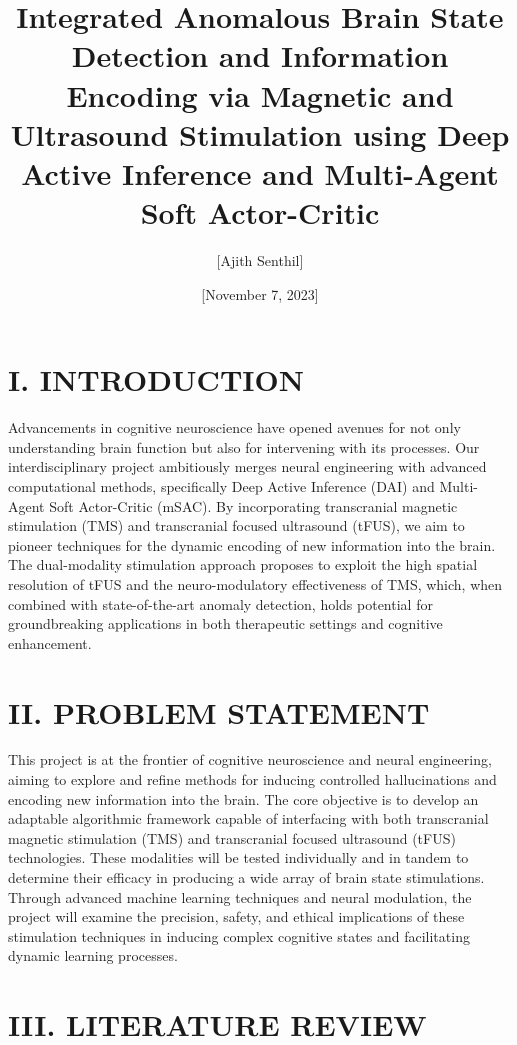 \documentclass{article}
\title{Integrated Anomalous Brain State Detection and Information Encoding via Magnetic and Ultrasound Stimulation using Deep Active Inference and Multi-Agent Soft Actor-Critic}
\author{[Ajith Senthil]}
\date{[November 7, 2023]}
\begin{document}
\maketitle


\section*{I. INTRODUCTION}
Advancements in cognitive neuroscience have opened avenues for not only understanding brain function but also for intervening with its processes. Our interdisciplinary project ambitiously merges neural engineering with advanced computational methods, specifically Deep Active Inference (DAI) and Multi-Agent Soft Actor-Critic (mSAC). By incorporating transcranial magnetic stimulation (TMS) and transcranial focused ultrasound (tFUS), we aim to pioneer techniques for the dynamic encoding of new information into the brain. The dual-modality stimulation approach proposes to exploit the high spatial resolution of tFUS and the neuro-modulatory effectiveness of TMS, which, when combined with state-of-the-art anomaly detection, holds potential for groundbreaking applications in both therapeutic settings and cognitive enhancement.


\section*{II. PROBLEM STATEMENT}
This project is at the frontier of cognitive neuroscience and neural engineering, aiming to explore and refine methods for inducing controlled hallucinations and encoding new information into the brain. The core objective is to develop an adaptable algorithmic framework capable of interfacing with both transcranial magnetic stimulation (TMS) and transcranial focused ultrasound (tFUS) technologies. These modalities will be tested individually and in tandem to determine their efficacy in producing a wide array of brain state stimulations. Through advanced machine learning techniques and neural modulation, the project will examine the precision, safety, and ethical implications of these stimulation techniques in inducing complex cognitive states and facilitating dynamic learning processes.


\section*{III. LITERATURE REVIEW}
\end{document}
